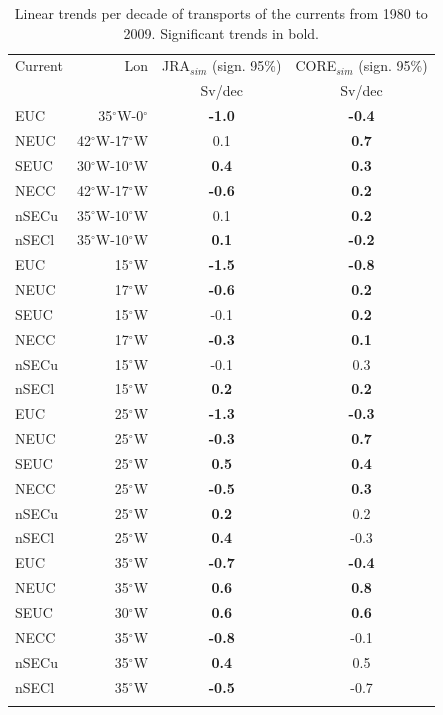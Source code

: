 \documentclass[os, manuscript]{copernicus}
\begin{document}
	\begin{table}[t]
		\caption{Linear trends per decade of transports of the currents from 1980 to 2009. Significant trends in bold.\\
		}
		\centering
		\begin{tabular}{lrcc}
			\tophline
			Current & Lon & JRA$_{sim}$ (sign. 95\%) & CORE$_{sim}$ (sign. 95\%)\\
			&&Sv/dec&Sv/dec\\
			\middlehline
			EUC  & 35$^{\circ}$W-0$^{\circ}$ & \textbf{-1.0}  	& \textbf{-0.4}  \\
			NEUC & 42$^{\circ}$W-17$^{\circ}$W & 0.1 			& \textbf{0.7}  \\
			SEUC & 30$^{\circ}$W-10$^{\circ}$W & \textbf{0.4}  	& \textbf{0.3}  \\
			NECC & 42$^{\circ}$W-17$^{\circ}$W & \textbf{-0.6}  	& \textbf{0.2}  \\
			nSECu & 35$^{\circ}$W-10$^{\circ}$W  & 0.1 			&\textbf{ 0.2}  \\
			nSECl  & 35$^{\circ}$W-10$^{\circ}$W & \textbf{0.1}  	& \textbf{-0.2}  \\
			\middlehline
			EUC & 15$^{\circ}$W & \textbf{-1.5}  		& \textbf{-0.8}  \\
			NEUC & 17$^{\circ}$W & \textbf{-0.6}  	& \textbf{0.2}  \\
			SEUC & 15$^{\circ}$W & -0.1 			& \textbf{0.2}  \\
			NECC & 17$^{\circ}$W & \textbf{-0.3}  	& \textbf{0.1}  \\
			nSECu & 15$^{\circ}$W & -0.1 			& 0.3 \\
			nSECl & 15$^{\circ}$W & \textbf{0.2}  	& \textbf{0.2}\\
			\middlehline
			EUC & 25$^{\circ}$W & \textbf{-1.3}  & \textbf{-0.3}  \\
			NEUC & 25$^{\circ}$W & \textbf{-0.3}  &\textbf{ 0.7}  \\
			SEUC & 25$^{\circ}$W & \textbf{0.5}  & \textbf{0.4}  \\
			NECC & 25$^{\circ}$W & \textbf{-0.5}  & \textbf{0.3}  \\
			nSECu & 25$^{\circ}$W & \textbf{0.2}  & 0.2 \\
			nSECl & 25$^{\circ}$W & \textbf{0.4}  & -0.3 \\
			\middlehline
			EUC & 35$^{\circ}$W & \textbf{-0.7 } & \textbf{-0.4}  \\
			NEUC & 35$^{\circ}$W & \textbf{0.6}  &\textbf{ 0.8}  \\
			SEUC & 30$^{\circ}$W & \textbf{0.6}  & \textbf{0.6}  \\
			NECC & 35$^{\circ}$W & \textbf{-0.8}  & -0.1 \\
			nSECu & 35$^{\circ}$W & \textbf{0.4}  & 0.5 \\
			nSECl & 35$^{\circ}$W & \textbf{-0.5}  & -0.7 \\
			\bottomhline
		\end{tabular}
		\label{tab_trends_INT}
	\end{table}
	
\end{document}
